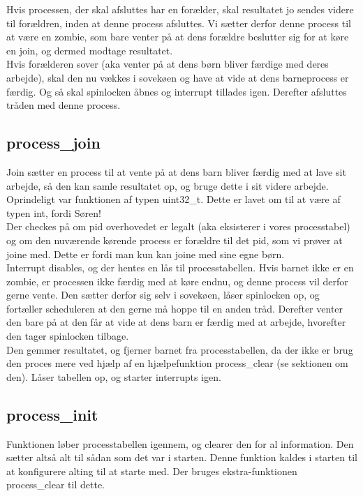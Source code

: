\documentclass[10pt,a4paper,danish]{article}
\begin{document}
Hvis processen, der skal afsluttes har en forælder, skal resultatet jo sendes videre til forældren, inden at denne process afsluttes. Vi sætter derfor denne process til at være en zombie, som bare venter på at dens forældre beslutter sig for at køre en join, og dermed modtage resultatet. \\

Hvis forælderen sover (aka venter på at dens børn bliver færdige med deres arbejde), skal den nu vækkes i sovekøen og have at vide at dens barneprocess er færdig. Og så skal spinlocken åbnes og interrupt tillades igen. Derefter afsluttes tråden med denne process.

\subsection{process\_join}
Join sætter en process til at vente på at dens barn bliver færdig med at lave sit arbejde, så den kan samle resultatet op, og bruge dette i sit videre arbejde. Oprindeligt var funktionen af typen uint32\_t. Dette er lavet om til at være af typen int, fordi Søren! \\

Der checkes på om pid overhovedet er legalt (aka eksisterer i vores processtabel) og om den nuværende kørende process er forældre til det pid, som vi prøver at joine med. Dette er fordi man kun kan joine med sine egne børn.\\

Interrupt disables, og der hentes en lås til processtabellen. Hvis barnet ikke er en zombie, er processen ikke færdig med at køre endnu, og denne process vil derfor gerne vente. Den sætter derfor sig selv i sovekøen, låser spinlocken op, og fortæller scheduleren at den gerne må hoppe til en anden tråd. Derefter venter den bare på at den får at vide at dens barn er færdig med at arbejde, hvorefter den tager spinlocken tilbage.\\

Den gemmer resultatet, og fjerner barnet fra processtabellen, da der ikke er brug den proces mere ved hjælp af en hjælpefunktion process\_clear (se sektionen om den). Låser tabellen op, og starter interrupts igen.

\subsection{process\_init}
Funktionen løber processtabellen igennem, og clearer den for al information. Den sætter altså alt til sådan som det var i starten. Denne funktion kaldes i starten til at konfigurere alting til at starte med. Der bruges ekstra-funktionen process\_clear til dette.
\end{document}
